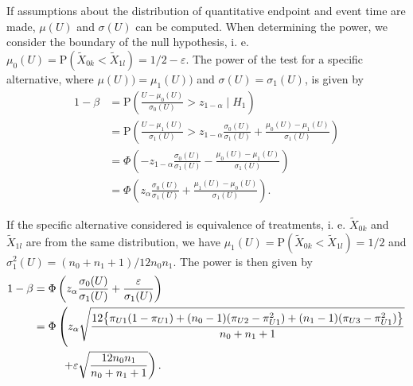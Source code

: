 \documentclass[bimj,fleqn]{w-art}\usepackage[]{graphicx}\usepackage[]{color}
\theoremstyle{plain}
\theoremstyle{definition}
\begin{document}
If assumptions about the distribution of quantitative endpoint and event time
are made, $\mu(U)$ and $\sigma(U)$ can be computed. When determining the power,
we consider the boundary of the null hypothesis, i. e.
$\mu_0(U) = \text{P}(\widetilde{X}_{0k} < \widetilde{X}_{1l}) = 1/2 - \varepsilon$.
The power of the test for a specific alternative, where $\mu(U)) = \mu_1(U))$
and $\sigma(U) = \sigma_1(U)$, is given by
\begin{align*}
  1 - \beta &= \text{P} \left(\frac{U - \mu_0(U)}{\sigma_0(U)}  >
                                 z_{1-\alpha} \mid H_1 \right) \\
            &= \text{P} \left(\frac{U - \mu_1(U)}{\sigma_1(U)}  >
                                 z_{1-\alpha}\frac{\sigma_0(U)}{\sigma_1(U)} +
                                 \frac{\mu_0(U) - \mu_1(U)}{\sigma_1(U)} \right) \\
            &= \Phi\left(- z_{1-\alpha}\frac{\sigma_0(U)}{\sigma_1(U)} -
                            \frac{\mu_0(U) - \mu_1(U)}{\sigma_1(U)} \right) \\
            &= \Phi\left(z_{\alpha}\frac{\sigma_0(U)}{\sigma_1(U)} +
                            \frac{\mu_1(U) - \mu_0(U)}{\sigma_1(U)} \right) .
\end{align*}

If the specific alternative considered is equivalence of treatments, i. e.
$\widetilde{X}_{0k}$ and $\widetilde{X}_{1l}$ are from the same distribution,
we have $\mu_1(U) = \text{P}(\widetilde{X}_{0k} < \widetilde{X}_{1l}) = 1/2$
and $\sigma^2_1(U) = (n_0 + n_1 +1) /12 n_0 n_1$. The power is
then given by
\begin{align*}
1 - \beta &= \Phi\left(z_{\alpha}\frac{\sigma_0(U)}{\sigma_1(U)} +
                            \frac{\varepsilon}{\sigma_1(U)} \right) \\
          &= \Phi\left(z_{\alpha} \sqrt{\frac{12 \big\{ \pi_{U1} (1 - \pi_{U1}) +
                                  (n_0 - 1) (\pi_{U2} - \pi_{U1}^2) +
                                  (n_1 - 1) (\pi_{U3} - \pi_{U1}^2) \big\}}{n_0 + n_1 +1}} \right.\\
          &{\hphantom{= \Phi\bigg(}} \left. + \varepsilon \sqrt{\frac{12 n_0 n_1 }{n_0 + n_1 +1}} \right) .
\end{align*}
\end{document}
